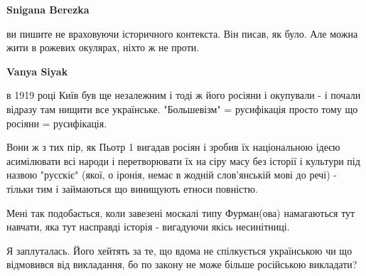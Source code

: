 \begin{itemize}
\begin{itemize}
 
\textbf{Snigana Berezka} 

ви пишите не враховуючи історичного контекста. Він писав, як було. Але можна
жити в рожевих окулярах, ніхто ж не проти.


\textbf{Vanya Siyak} 

в 1919 році Київ був ще незалежним і тоді ж його росіяни і окупували - і почали
відразу там нищити все українське. "Большевізм" = русифікація просто тому що
росіяни = русифікація.

Вони ж з тих пір, як Пьотр 1 вигадав росіян і зробив їх національною ідеєю
асимілювати всі народи і перетворювати їх на сіру масу без історії і культури
під назвою "русскіє" (якої, о іронія, немає в жодній слов'янській мові до речі)
- тільки тим і займаються що винищують етноси повністю.

 
Мені так подобається, коли завезені москалі типу Фурман(ова) намагаються тут
навчати, яка тут насправді історія - вигадуючи якісь несинітниці.

\end{itemize}

 

Я заплуталась. Його хейтять за те, що вдома не спілкується українською чи що
відмовився від викладання, бо по закону не може більше російською викладати?

\begin{itemize}
 

\end{itemize}
\end{itemize}
